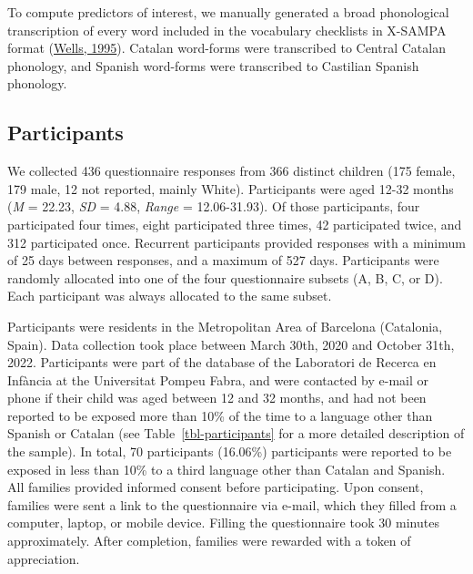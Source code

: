 \documentclass[
]{article}
\begin{document}
To compute predictors of interest, we manually generated a broad
phonological transcription of every word included in the vocabulary
checklists in X-SAMPA format
(\protect\hyperlink{ref-wells1995computercoding}{Wells, 1995}). Catalan
word-forms were transcribed to Central Catalan phonology, and Spanish
word-forms were transcribed to Castilian Spanish phonology.

\hypertarget{sec-participants}{%
\subsection{Participants}\label{sec-participants}}

We collected 436 questionnaire responses from 366 distinct children (175
female, 179 male, 12 not reported, mainly White). Participants were aged
12-32 months (\emph{M} = 22.23, \emph{SD} = 4.88, \emph{Range} =
12.06-31.93). Of those participants, four participated four times, eight
participated three times, 42 participated twice, and 312 participated
once. Recurrent participants provided responses with a minimum of 25
days between responses, and a maximum of 527 days. Participants were
randomly allocated into one of the four questionnaire subsets (A, B, C,
or D). Each participant was always allocated to the same subset.

Participants were residents in the Metropolitan Area of Barcelona
(Catalonia, Spain). Data collection took place between March 30th, 2020
and October 31th, 2022. Participants were part of the database of the
Laboratori de Recerca en Infància at the Universitat Pompeu Fabra, and
were contacted by e-mail or phone if their child was aged between 12 and
32 months, and had not been reported to be exposed more than 10\% of the
time to a language other than Spanish or Catalan (see
Table~\ref{tbl-participants} for a more detailed description of the
sample). In total, 70 participants (16.06\%) participants were reported
to be exposed in less than 10\% to a third language other than Catalan
and Spanish. All families provided informed consent before
participating. Upon consent, families were sent a link to the
questionnaire via e-mail, which they filled from a computer, laptop, or
mobile device. Filling the questionnaire took 30 minutes approximately.
After completion, families were rewarded with a token of appreciation.
\end{document}
